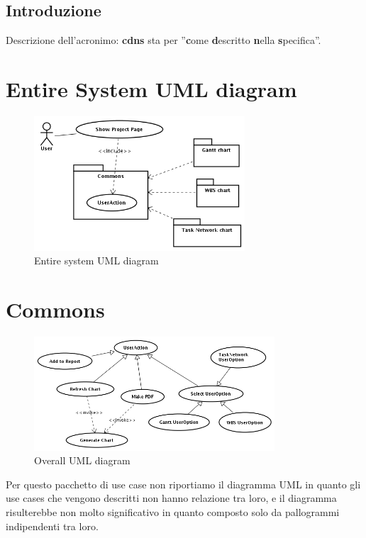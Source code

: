\documentclass[a4paper, 12pt]{report}
\begin{document}
\newpage

\section*{Introduzione}
Descrizione dell'acronimo: \textbf{cdns} sta per ''\textbf{c}ome
\textbf{d}escritto \textbf{n}ella \textbf{s}pecifica''.

\chapter*{Entire System UML diagram}
\begin{figure}[h!] \centering
\includegraphics[width=0.7\textwidth]{EntireSystem.png} 
\caption{Entire system UML diagram}
\label{fig:entireSystemDiagram}
\end{figure}

\chapter{Commons}
\begin{figure}[h!] \centering
\includegraphics[width=0.8\textwidth]{Commons/img/Overall.png} 
\caption{Overall UML diagram}
\label{fig:commonsOverallDiagram}
\end{figure}
Per questo pacchetto di use case non riportiamo il diagramma UML in quanto gli
use cases che vengono descritti non hanno relazione tra loro, e il diagramma
risulterebbe non molto significativo in quanto composto solo da pallogrammi
indipendenti tra loro.



\end{document}
